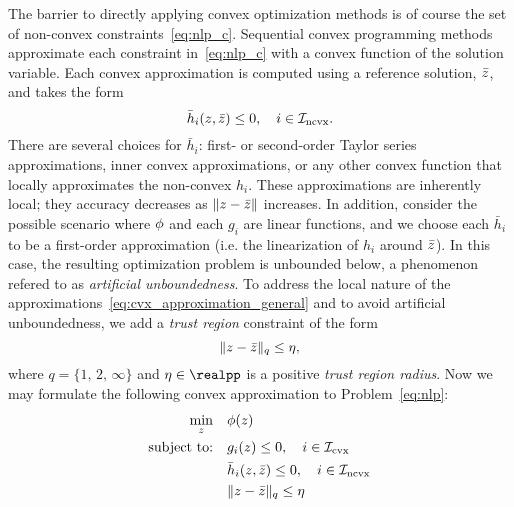 \documentclass[letterpaper, 10 pt, conference]{ieeeconf}
\begin{document}
The barrier to directly applying convex optimization methods is of course the set of non-convex constraints~\eqref{eq:nlp_c}. Sequential convex programming methods approximate each constraint in~\eqref{eq:nlp_c} with a convex function of the solution variable. Each convex approximation is computed using a reference solution, $\bar{z}$, and takes the form
\begin{equation}
\bar{h}_i(z,\bar{z}) \leq 0, \quad i\in\mathcal{I}_{\text{ncvx}}.
\label{eq:cvx_approximation_general}
\end{equation}
There are several choices for $\bar{h}_i$: first- or second-order Taylor series approximations, inner convex approximations, or any other convex function that locally approximates the non-convex $h_i$. These approximations are inherently local; they accuracy decreases as $\|z-\bar{z}\|$ increases. In addition, consider the possible scenario where $\phi$ and each $g_i$ are linear functions, and we choose each $\bar{h}_i$ to be a first-order approximation (i.e. the linearization of $h_i$ around $\bar{z}$). In this case, the resulting optimization problem is unbounded below, a phenomenon refered to as \textit{artificial unboundedness}. To address the local nature of the approximations~\eqref{eq:cvx_approximation_general} and to avoid artificial unboundedness, we add a \textit{trust region} constraint of the form
\begin{equation}
\| z - \bar{z} \|_q \leq \eta,
\label{eq:trust_region}
\end{equation}
where $q=\{1,\,2,\,\infty\}$ and $\tr\in\realpp$ is a positive \textit{trust region radius}. Now we may formulate the following convex approximation to Problem~\eqref{eq:nlp}:
\begin{subequations}\label{eq:cvx_tr}
\begin{align}
\min_z &\quad \phi(z) \label{eq:cvx_tr_a} \\
\text{subject to:} &\quad g_i(z) \leq 0, \quad i\in\mathcal{I}_{\text{cvx}} \label{eq:cvx_tr_b} \\
&\quad \bar{h}_i(z,\bar{z}) \leq 0, \quad i\in\mathcal{I}_{\text{ncvx}} \label{eq:cvx_tr_c}\\
&\quad \| z - \bar{z} \|_q \leq \eta  \label{eq:cvx_tr_d}
\end{align}
\end{subequations}
\end{document}
